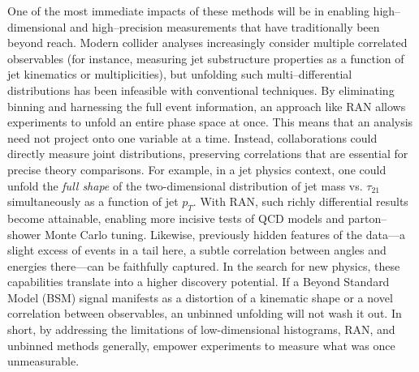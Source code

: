         One of the most immediate impacts of these methods will be in enabling {high--dimensional and high--precision measurements} that have traditionally been beyond reach.
        Modern collider analyses increasingly consider multiple correlated observables (for instance, measuring jet substructure properties as a function of jet kinematics or multiplicities), but unfolding such multi--differential distributions has been infeasible with conventional techniques.
        By eliminating binning and harnessing the full event information, an approach like RAN allows experiments to unfold an entire phase space at once.
        This means that an analysis need not project onto one variable at a time.
        Instead, collaborations could directly measure joint distributions, preserving correlations that are essential for precise theory comparisons.
        For example, in a jet physics context, one could unfold the \emph{full shape} of the two-dimensional distribution of jet mass vs. $\tau_{21}$ simultaneously as a function of jet $p_T$.
        With RAN, such richly differential results become attainable, enabling more incisive tests of QCD models and parton--shower Monte Carlo tuning.
        Likewise, previously hidden features of the data---a slight excess of events in a tail here, a subtle correlation between angles and energies there---can be faithfully captured.
        In the search for new physics, these capabilities translate into a higher discovery potential.
        If a Beyond Standard Model (BSM) signal manifests as a distortion of a kinematic shape or a novel correlation between observables, an unbinned unfolding will not wash it out.
        In short, by addressing the limitations of low-dimensional histograms, RAN, and unbinned methods generally, empower experiments to measure what was once unmeasurable.
    
